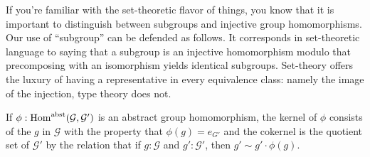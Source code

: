\begin{remark}
  If you're familiar with the set-theoretic flavor of things, you know that it is important to distinguish between subgroups and injective group homomorphisms.  
Our use of ``subgroup'' can be defended as follows.  It corresponds in set-theoretic language to saying that a subgroup is an injective homomorphism modulo that precomposing with an isomorphism yields identical subgroups.  
Set-theory offers the luxury of having a representative in every equivalence class: namely the image of the injection, type theory does not.
\end{remark}
If $\phi:\mathrm{Hom}^{\mathrm{abst}}(\mathcal G,\mathcal G')$ is an abstract group homomorphism, the kernel of $\phi$ consists of the $g$ in $\mathcal G$ with the property that $\phi(g)=e_{G'}$ and the cokernel is the quotient set of $\mathcal G'$ by the relation that if $g:\mathcal G$ and $g':\mathcal G'$, then $g'\sim g'\cdot\phi(g)$.  

